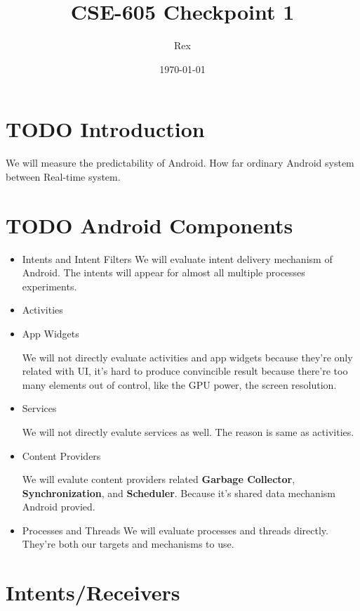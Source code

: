 \documentclass[11pt]{article}
\author{Rex}
\date{\today}
\title{CSE-605 Checkpoint 1}
\begin{document}
\maketitle
\tableofcontents


\section{{\bfseries\sffamily TODO} Introduction}
\label{sec-1}
We will measure the predictability of Android.
How far ordinary Android system between Real-time system.

\section{{\bfseries\sffamily TODO} Android Components}
\label{sec-2}
\begin{itemize}
\item Intents and Intent Filters
We will evaluate intent delivery mechanism of Android.
The intents will appear for almost all multiple processes experiments.

\item Activities
\item App Widgets

We will not directly evaluate activities and app widgets because they're only related with UI,
it's hard to produce convincible result because there're too many elements out of control,
like the GPU power, the screen resolution.

\item Services

We will not directly evalute services as well. The reason is same as activities.
\item Content Providers

We will evalute content providers related \textbf{Garbage Collector}, \textbf{Synchronization},
and \textbf{Scheduler}. Because it's shared data mechanism Android provied.
\end{itemize}


\begin{itemize}
\item Processes and Threads
We will evaluate processes and threads directly.
They're both our targets and mechanisms to use.
\end{itemize}

\section{Intents/Receivers}
\label{sec-3}
\end{document}
